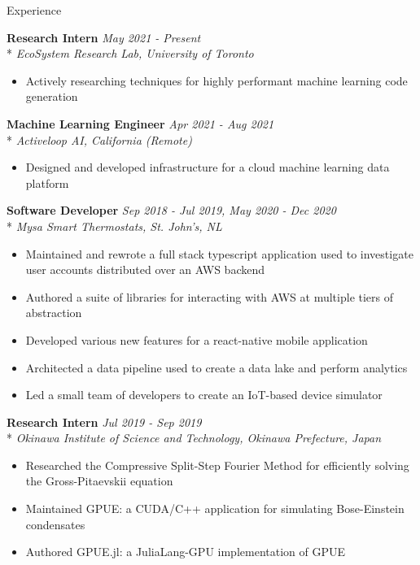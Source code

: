 \documentclass[11pt, letterpaper]{article}
\begin{document}
\begin{section}{Experience}

\textbf{Research Intern}
\hfill
\textit{May 2021 - Present}\\*
\textit{EcoSystem Research Lab, University of Toronto}
\begin{itemize}
  \item Actively researching techniques for highly performant machine learning code generation \\
\end{itemize}

\textbf{Machine Learning Engineer}
\hfill
\textit{Apr 2021 - Aug 2021}\\*
\textit{Activeloop AI, California (Remote)}
\begin{itemize}
  \item Designed and developed infrastructure for a cloud machine learning data platform \\
\end{itemize}

\textbf{Software Developer}
\hfill
\textit{Sep 2018 - Jul 2019, May 2020 - Dec 2020}\\*
\textit{Mysa Smart Thermostats, St. John's, NL}
\begin{itemize}
  \item Maintained and rewrote a full stack typescript application used to investigate user accounts distributed over an AWS backend
  \item Authored a suite of libraries for interacting with AWS at multiple tiers of abstraction
  \item Developed various new features for a react-native mobile application
  \item Architected a data pipeline used to create a data lake and perform analytics
  \item Led a small team of developers to create an IoT-based device simulator \\
\end{itemize}

\textbf{Research Intern}
\hfill
\textit{Jul 2019 - Sep 2019}\\*
\textit{Okinawa Institute of Science and Technology, Okinawa Prefecture, Japan}
\begin{itemize}
  \item Researched the Compressive Split-Step Fourier Method for efficiently solving the Gross-Pitaevskii equation
  \item Maintained GPUE: a CUDA/C++ application for simulating Bose-Einstein condensates
  \item Authored GPUE.jl: a JuliaLang-GPU implementation of GPUE
\end{itemize}

\end{section}
\end{document}
